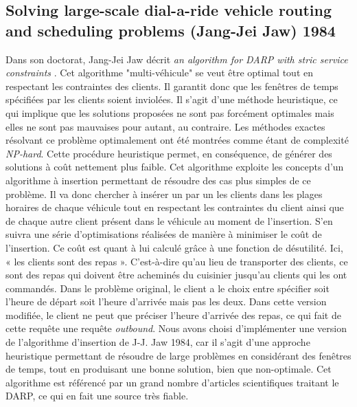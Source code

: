 \documentclass[10pt,a4paper]{report}
\begin{document}
\subsection*{Solving large-scale dial-a-ride vehicle routing and scheduling problems (Jang-Jei Jaw) 1984 }
Dans son doctorat, Jang-Jei Jaw décrit \textit{\og an algorithm for DARP with stric service constraints \fg{}}.  Cet algorithme "multi-véhicule" se veut être optimal tout en respectant les contraintes des clients.
Il garantit donc que les fenêtres de temps spécifiées par les clients soient inviolées.
Il s'agit d'une méthode heuristique, ce qui implique que les solutions proposées ne sont pas forcément optimales mais elles ne sont pas mauvaises pour autant, au contraire. Les méthodes exactes résolvant ce problème optimalement ont été montrées comme étant de complexité \textit{NP-hard}. %
Cette procédure heuristique permet, en conséquence, de générer des solutions à coût nettement plus faible.%
Cet algorithme exploite les concepts d'un algorithme à insertion permettant de résoudre des cas plus simples de ce problème. Il va donc chercher à insérer un par un les clients dans les plages horaires de chaque véhicule tout en respectant les contraintes du client ainsi que de chaque autre client présent dans le véhicule au moment de l'insertion.
S'en suivra une série d'optimisations réalisées de manière à minimiser le coût de l'insertion. Ce coût est quant à lui calculé grâce à une fonction de désutilité. Ici, « les clients sont des repas ». C'est-à-dire qu'au lieu de transporter des clients, ce sont des repas qui doivent être acheminés du cuisinier jusqu'au clients qui les ont commandés.
Dans le problème original, le client a le choix entre spécifier soit l'heure de départ soit l'heure d'arrivée mais pas les deux. Dans cette version modifiée, le client ne peut que préciser l'heure d'arrivée des repas, ce qui fait de cette requête une requête \textit{outbound}.
\newline
Nous avons choisi d'implémenter une version de l'algorithme d'insertion de J-J. Jaw 1984, car il s'agit d'une approche heuristique permettant de résoudre de large problèmes en considérant des fenêtres de temps, tout en produisant une bonne solution, bien que non-optimale. Cet algorithme est référencé par un grand nombre d'articles scientifiques traitant le DARP, ce qui en fait une source très fiable.
\end{document}
